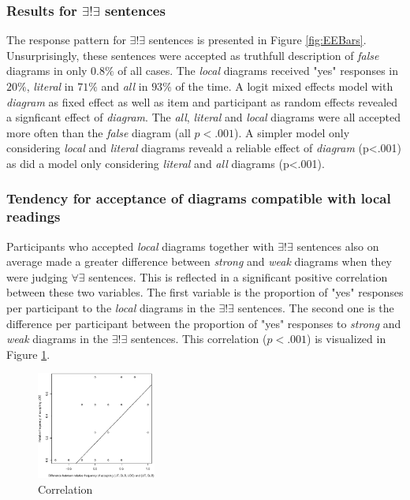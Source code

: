 \documentclass[a4paper,10pt]{article}
\begin{document}
\subsubsection{Results for $\exists! \exists$ sentences}
The response pattern for $\exists! \exists$ sentences is presented in Figure \ref{fig:EEBars}. Unsurprisingly, these sentences were accepted as truthfull description of {\it false} diagrams in only $0.8\%$ of all cases. The {\it local} diagrams received  "yes" responses in $20\%$, {\it literal} in $71\%$ and {\it all} in $93\%$ of the time. A logit mixed effects model with {\it diagram} as fixed effect as well as item and participant as random effects revealed a signficant effect of {\it diagram}. The {\it all}, {\it literal} and {\it local} diagrams were all accepted more often than the {\it false} diagram (all $p<.001$). A simpler model only considering {\it local} and {\it literal} diagrams reveald a reliable effect of {\it diagram} (p<.001) as did a model only considering {\it literal} and {\it all} diagrams (p<.001).

\subsubsection{Tendency for acceptance of diagrams compatible with local readings}
Participants who accepted {\it local} diagrams together with $\exists! \exists$ sentences also on average made a greater difference between {\it strong} and {\it weak} diagrams when they were judging $\forall \exists$ sentences. This is reflected in a significant positive correlation between these two variables. The first variable is the proportion of "yes" responses per participant to the {\it local} diagrams in the $\exists! \exists$ sentences. The second one is the difference per participant between the proportion of "yes" responses to {\it strong} and {\it weak} diagrams in the $\exists! \exists$ sentences. This correlation ($p<.001$) is visualized in Figure \ref{fig:cor}. 

\begin{figure}[t]
\begin{center}
\includegraphics[width=3.92cm]{../data/KorrelationScatterPlot.eps}
\end{center}
\label{fig:cor}
\caption{Correlation}
\end{figure}



\end{document}
